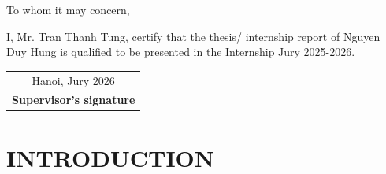 \documentclass[a4paper,12pt]{report}
\begin{document}
\newpage
\thispagestyle{plain}

\begin{center}
    To whom it may concern,
\end{center}

\vspace{1.5cm}

I, Mr. Tran Thanh Tung, certify that the thesis/ internship report of Nguyen Duy Hung is qualified to be presented in the Internship Jury 2025-2026.

\vspace{4.5cm}

\hfill 
\begin{tabular}{c}
     Hanoi, Jury 2026 \\
     \textbf{Supervisor's signature}
\end{tabular}


{
\linespread{1.3}\selectfont
\setlength{\parskip}{0.5em}

\tableofcontents
{}
\newpage

\listoffigures
{}
\newpage

\listoftables
{}
}
\newpage

\chapter{INTRODUCTION}

\setlength{\parindent}{0pt} %
\setlength{\parskip}{1.2em} %
\linespread{1.3}\selectfont %
\titlespacing*{\section}{0pt}{12pt}{4pt} %
\end{document}
